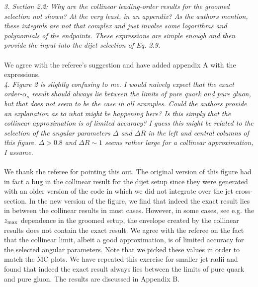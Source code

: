 \documentclass[a4paper,11pt]{article}
\begin{document}
\noindent \textit{3. Section 2.2: Why are the collinear leading-order results for the groomed selection not shown? At the very least, in an appendix? As the authors mention, these integrals are not that complex and just involve some logarithms and polynomials of the endpoints. These expressions are simple enough and then provide the input into the dijet selection of Eq. 2.9.
}
\\
\\
We agree with the referee’s suggestion and have added appendix A with the expressions. 
\\

\noindent\textit{4. Figure 2 is slightly confusing to me. I would naively expect that the exact order-$\alpha_s$ result should always lie between the limits of pure quark and pure gluon, but that does not seem to be the case in all examples. Could the authors provide an explanation as to what might be happening here? Is this simply that the collinear approximation is of limited accuracy? I guess this might be related to the selection of the angular parameters $\Delta$ and $\Delta R$ in the left and central columns of this figure. $\Delta>0.8$ and $\Delta R\sim1$ seems rather large for a collinear approximation, I assume.}
\\
\\
We thank the referee for pointing this out. The original version of this figure had in fact a bug in the collinear result for the dijet setup since they were generated with an older version of the code in which we did not integrate over the jet cross-section. In the new version of the figure, we find that indeed the exact result lies in between the collinear results in most cases. However, in some cases, see e.g. the $z_{\rm max}$ dependence in the groomed setup, the envelope created by the collinear results does not contain the exact result. We agree with the referee on the fact that the collinear limit, albeit a good approximation, is of limited accuracy for the selected angular parameters.  Note that we picked these values in order to match the MC plots. We have repeated this exercise for smaller jet radii and found that indeed the exact result always lies between the limits of pure quark and pure gluon. The results are discussed in Appendix B.  
\\
\end{document}
